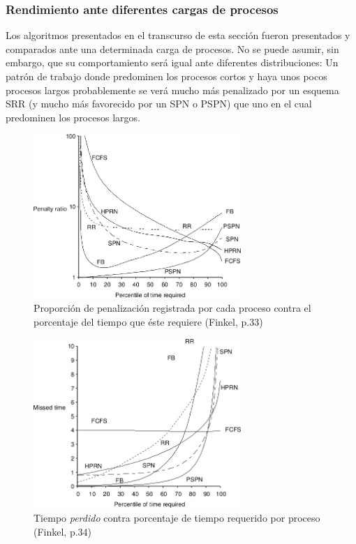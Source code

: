 \documentclass[11pt,fleqn]{book} %
\begin{document}
\subsubsection{Rendimiento ante diferentes cargas de procesos}
\label{sec-4-2-9-1}


Los algoritmos presentados en el transcurso de esta sección fueron
presentados y comparados ante una determinada carga de procesos. No se
puede asumir, sin embargo, que su comportamiento será igual ante
diferentes distribuciones: Un patrón de trabajo donde predominen los
procesos cortos y haya unos pocos procesos largos probablemente se
verá mucho más penalizado por un esquema SRR (y mucho más favorecido
por un SPN o PSPN) que uno en el cual predominen los procesos largos.

\begin{figure}[htb]
\centering
\includegraphics[width=0.7\textwidth]{./img/penalizaciones_por_algoritmo_planificador.png}
\caption{\label{PLAN_penalizaciones_por_algoritmo_planificador}Proporción de penalización registrada por cada proceso contra el porcentaje del tiempo que éste requiere (Finkel, p.33)}
\end{figure}

\begin{figure}[htb]
\centering
\includegraphics[width=0.7\textwidth]{./img/tiempo_en_espera_por_algoritmo_planificador.png}
\caption{\label{PLAN_tiempo_en_espera_por_algoritmo_planificador}Tiempo \emph{perdido} contra porcentaje de tiempo requerido por proceso (Finkel, p.34)}
\end{figure}
\end{document}
